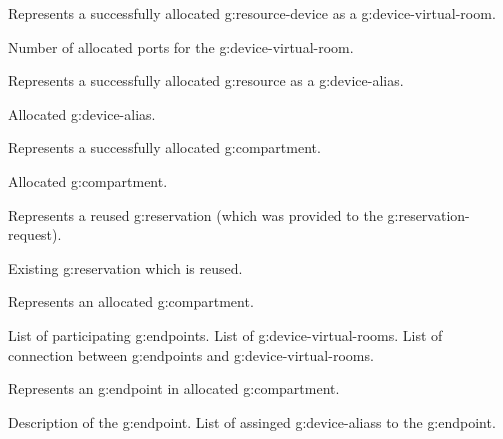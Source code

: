 \begin{Api}
Represents a successfully allocated \gls{g:resource-device} as a \gls{g:device-virtual-room}.
\begin{ApiClassAttributes}
 Number of allocated ports for the \gls{g:device-virtual-room}.
\end{ApiClassAttributes}

Represents a successfully allocated \gls{g:resource} as a \gls{g:device-alias}.
\begin{ApiClassAttributes}
 Allocated \gls{g:device-alias}.
\end{ApiClassAttributes}

Represents a successfully allocated \gls{g:compartment}.
\begin{ApiClassAttributes}
 Allocated \gls{g:compartment}.
\end{ApiClassAttributes}

Represents a reused \gls{g:reservation} (which was provided to the \gls{g:reservation-request}).
\begin{ApiClassAttributes}
 Existing \gls{g:reservation} which is reused.
\end{ApiClassAttributes}

Represents an allocated \gls{g:compartment}.
\begin{ApiClassAttributes}
 List of participating \glspl{g:endpoint}.
 List of \glspl{g:device-virtual-room}.
 List of connection between \glspl{g:endpoint} and \glspl{g:device-virtual-room}.
\end{ApiClassAttributes}

Represents an \gls{g:endpoint} in allocated \gls{g:compartment}.
\begin{ApiClassAttributes}
 Description of the \gls{g:endpoint}.
 List of assinged \glspl{g:device-alias} to the \gls{g:endpoint}.
\end{ApiClassAttributes}


\end{Api}
